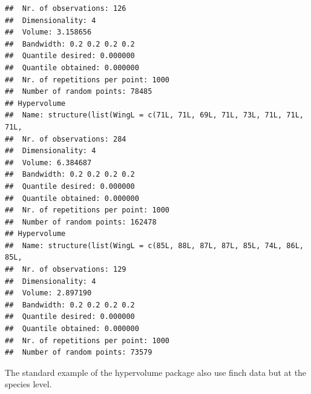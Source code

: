 \documentclass[12pt]{article}\usepackage[]{graphicx}\usepackage[]{color}
\makeatletter
\newenvironment{kframe}{%
 \def\at@end@of@kframe{}%
 \ifinner\ifhmode%
  \def\at@end@of@kframe{\end{minipage}}%
  \begin{minipage}{\columnwidth}%
 \fi\fi%
 \def\FrameCommand##1{\hskip\@totalleftmargin \hskip-\fboxsep
 \colorbox{shadecolor}{##1}\hskip-\fboxsep
     \hskip-\linewidth \hskip-\@totalleftmargin \hskip\columnwidth}%
 \MakeFramed {\advance\hsize-\width
   \@totalleftmargin\z@ \linewidth\hsize
   \@setminipage}}%
 {\par\unskip\endMakeFramed%
 \at@end@of@kframe}
\newenvironment{knitrout}{}{} %
\makeatother
\begin{document}
\begin{knitrout}
\begin{kframe}
\begin{verbatim}
## 	Nr. of observations: 126
## 	Dimensionality: 4
## 	Volume: 3.158656
## 	Bandwidth: 0.2 0.2 0.2 0.2
## 	Quantile desired: 0.000000
## 	Quantile obtained: 0.000000
## 	Nr. of repetitions per point: 1000
## 	Number of random points: 78485
## Hypervolume
## 	Name: structure(list(WingL = c(71L, 71L, 69L, 71L, 73L, 71L, 71L, 71L, 
## 	Nr. of observations: 284
## 	Dimensionality: 4
## 	Volume: 6.384687
## 	Bandwidth: 0.2 0.2 0.2 0.2
## 	Quantile desired: 0.000000
## 	Quantile obtained: 0.000000
## 	Nr. of repetitions per point: 1000
## 	Number of random points: 162478
## Hypervolume
## 	Name: structure(list(WingL = c(85L, 88L, 87L, 87L, 85L, 74L, 86L, 85L, 
## 	Nr. of observations: 129
## 	Dimensionality: 4
## 	Volume: 2.897190
## 	Bandwidth: 0.2 0.2 0.2 0.2
## 	Quantile desired: 0.000000
## 	Quantile obtained: 0.000000
## 	Nr. of repetitions per point: 1000
## 	Number of random points: 73579
\end{verbatim}
\end{kframe}
\end{knitrout}


The standard example of the hypervolume package also use finch data but at the species level.
\end{document}
